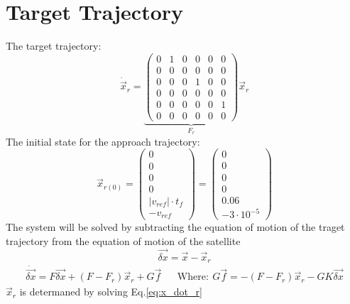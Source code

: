 \documentclass[11pt, a4paper]{article}
\begin{document}
\section{Target Trajectory}
The target trajectory:
\begin{equation} \label{eq:x_dot_r}
    \dot{\vec{x}}_r = \underbrace{\begin{pmatrix}
        0 & 1 & 0 & 0 & 0 & 0\\
        0 & 0 & 0 & 0 & 0 & 0\\
        0 & 0 & 0 & 1 & 0 & 0\\
        0 & 0 & 0 & 0 & 0 & 0\\
        0 & 0 & 0 & 0 & 0 & 1\\
        0 & 0 & 0 & 0 & 0 & 0
    \end{pmatrix}}_{\displaystyle F_r}\vec{x}_r \end{equation}
The initial state for the approach trajectory:
\begin{equation}
    \vec{x}_{r(0)} = \begin{pmatrix}
        0\\0\\
        0\\0\\
        \left|v_{ref}\right|\cdot t_f\\-v_{ref}
    \end{pmatrix} = \begin{pmatrix}
        0\\0\\0\\0\\0.06\\-3\cdot10^{-5}
    \end{pmatrix}
\end{equation}
The system will be solved by subtracting the equation of motion of the traget trajectory from the equation of motion of the satellite
\begin{equation}
    \vec{\delta x}=\vec{x}-\vec{x}_r
\end{equation}
\begin{equation}
    \begin{matrix}
        \dot{\vec{\delta x}}=F\vec{\delta x}+\left(F-F_r\right)\vec{x}_r+G\vec{f} && \mathrm{Where}:\ G\vec{f}=-\left(F-F_r\right)\vec{x}_r-GK\vec{\delta x}
    \end{matrix}
\end{equation}
$\vec{x}_r$ is determaned by solving Eq.\ref{eq:x_dot_r}
\newpage
\end{document}
